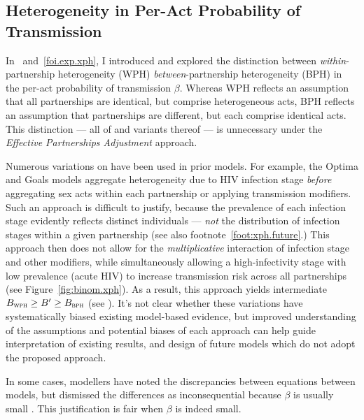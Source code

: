 \subsection{Heterogeneity in Per-Act Probability of Transmission}\label{foi.disc.xph}
In ~and~\ref{foi.exp.xph}, I introduced and explored the distinction between
\emph{within}-partnership heterogeneity (WPH) \vs \emph{between}-partnership heterogeneity (BPH)
in the per-act probability of transmission $\beta$. Whereas
WPH reflects an assumption that all partnerships are identical, but comprise heterogeneous acts,
BPH reflects an assumption that partnerships are different, but each comprise identical acts.
This distinction --- \ie all of  and variants thereof ---
is unnecessary under the \emph{Effective Partnerships Adjustment} approach.
\par
Numerous variations on  have been used in prior models.
For example, the Optima \cite{Kerr2015} and Goals \cite{Stover2014} models
aggregate heterogeneity due to HIV infection stage
\emph{before} aggregating sex acts within each partnership or applying transmission modifiers.
Such an approach is difficult to justify, because
the prevalence of each infection stage evidently reflects distinct individuals
--- \emph{not} the distribution of infection stages within a given partnership
(see also footnote~\ref{foot:xph.future}.)
This approach then does not allow for
the \emph{multiplicative} interaction of infection stage and other modifiers,
while simultaneously allowing a high-infectivity stage with low prevalence (\eg acute HIV)
to increase transmission risk across all partnerships (see Figure~\ref{fig:binom.xph}).
As a result, this approach yields intermediate $B_{\textsc{wph}} \ge B' \ge B_{\textsc{bph}}$
(see ).
It's not clear whether these variations have systematically biased existing model-based evidence,
but improved understanding of the assumptions and potential biases of each approach
can help guide interpretation of existing results,
and design of future models which do not adopt the proposed approach.
\par
In some cases, modellers have noted the discrepancies between equations between models,
but dismissed the differences as inconsequential because $\beta$ is usually small
\cite{Kerr2015}. %
This justification is fair when $\beta$ is indeed small.
